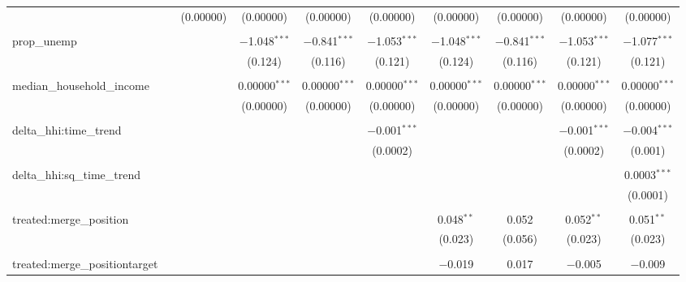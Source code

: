 \begin{table}[H]
{\begin{tabular}{@{\extracolsep{5pt}}lccccccccc}
   &  & (0.00000) & (0.00000) & (0.00000) & (0.00000) & (0.00000) & (0.00000) & (0.00000) & (0.00000) \\  

   & & & & & & & & & \\  

  prop\_unemp &  &  & $-$1.048$^{***}$ & $-$0.841$^{***}$ & $-$1.053$^{***}$ & $-$1.048$^{***}$ & $-$0.841$^{***}$ & $-$1.053$^{***}$ & $-$1.077$^{***}$ \\  

   &  &  & (0.124) & (0.116) & (0.121) & (0.124) & (0.116) & (0.121) & (0.121) \\  

   & & & & & & & & & \\  

  median\_household\_income &  &  & 0.00000$^{***}$ & 0.00000$^{***}$ & 0.00000$^{***}$ & 0.00000$^{***}$ & 0.00000$^{***}$ & 0.00000$^{***}$ & 0.00000$^{***}$ \\  

   &  &  & (0.00000) & (0.00000) & (0.00000) & (0.00000) & (0.00000) & (0.00000) & (0.00000) \\  

   & & & & & & & & & \\  

  delta\_hhi:time\_trend &  &  &  &  & $-$0.001$^{***}$ &  &  & $-$0.001$^{***}$ & $-$0.004$^{***}$ \\  

   &  &  &  &  & (0.0002) &  &  & (0.0002) & (0.001) \\  

   & & & & & & & & & \\  

  delta\_hhi:sq\_time\_trend &  &  &  &  &  &  &  &  & 0.0003$^{***}$ \\  

   &  &  &  &  &  &  &  &  & (0.0001) \\  

   & & & & & & & & & \\  

  treated:merge\_position &  &  &  &  &  & 0.048$^{**}$ & 0.052 & 0.052$^{**}$ & 0.051$^{**}$ \\  

   &  &  &  &  &  & (0.023) & (0.056) & (0.023) & (0.023) \\  

   & & & & & & & & & \\  

  treated:merge\_positiontarget &  &  &  &  &  & $-$0.019 & 0.017 & $-$0.005 & $-$0.009 \\  


\end{tabular}}
\end{table}
